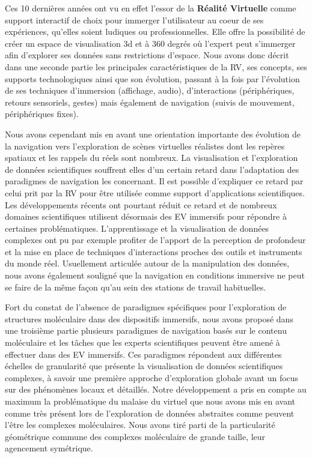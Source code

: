 
Ces 10 dernières années ont vu en effet l'essor de la \textbf{Réalité Virtuelle} comme support interactif de choix pour immerger l'utilisateur au coeur de ses expériences, qu'elles soient ludiques ou professionnelles. Elle offre la possibilité de créer un espace de visualisation 3d et à 360 degrés où l'expert peut s'immerger afin d'explorer ses données sans restrictions d'espace. Nous avons donc décrit dans une seconde partie les principales caractéristiques de la RV, ses concepts, ses supports technologiques ainsi que son évolution, passant à la fois par l'évolution de ses techniques d'immersion (affichage, audio), d'interactions (périphériques, retours sensoriels, gestes) mais également de navigation (suivis de mouvement, périphériques fixes). 

Nous avons cependant mis en avant une orientation importante des évolution de la navigation vers l'exploration de scènes virtuelles réalistes dont les repères spatiaux et les rappels du réels sont nombreux. La visualisation et l'exploration de données scientifiques souffrent elles d'un certain retard dans l'adaptation des paradigmes de navigation les concernant. Il est possible d'expliquer ce retard par celui prit par la RV pour être utilisée comme support d'applications scientifiques. Les développements récents ont pourtant réduit ce retard et de nombreux domaines scientifiques utilisent désormais des EV immersifs pour répondre à certaines problématiques. L'apprentissage et la visualisation de données complexes ont pu par exemple profiter de l'apport de la perception de profondeur et la mise en place de techniques d'interactions proches des outils et instruments du monde réel. Usuellement articulée autour de la manipulation des données, nous avons également souligné que la navigation en conditions immersive ne peut se faire de la même façon qu'au sein des stations de travail habituelles. 



Fort du constat de l'absence de paradigmes spécifiques pour l'exploration de structures moléculaire dans des dispositifs immersifs, nous avons proposé dans une troisième partie plusieurs paradigmes de navigation basés sur le contenu moléculaire et les tâches que les experts scientifiques peuvent être amené à effectuer dans des EV immersifs. Ces paradigmes répondent aux différentes échelles de granularité que présente la visualisation de données scientifiques complexes, à savoir une première approche d'exploration globale avant un focus sur des phénomènes locaux et détaillés. Notre développement a pris en compte au maximum la problématique du malaise du virtuel que nous avons mis en avant comme très présent lors de l'exploration de données abstraites comme peuvent l'être les complexes moléculaires. Nous avons tiré parti de la particularité géométrique commune des complexes moléculaire de grande taille, leur agencement symétrique.

